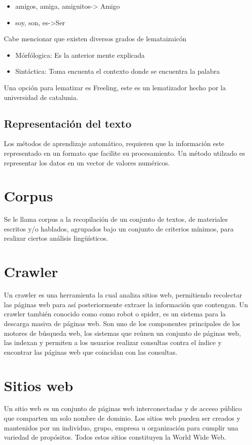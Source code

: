 	\begin{itemize}
		\item amigos, amiga, amiguitos-> Amigo
		\item soy, son, es->Ser
	\end{itemize}

Cabe mencionar que existen diversos grados de lemataizaicón

	\begin{itemize}
		\item Mórfólogica: Es la anterior mente explicada
		\item Sintáctica: Toma encuenta el contexto donde se encuentra la palabra

	\end{itemize}

Una opción para lematizar es Freeling, este es un lematizador hecho por la
universidad de catalunia.

\subsection[Representación del t.]{Representación del texto}
Los métodos de aprendizaje automático, requieren que la información este
representado en un formato que facilite su procesamiento. Un método utilzado
es representar los datos en un vector de valores numéricos.

\section{Corpus}
Se le llama corpus a la recopilación de un conjunto de textos, de materiales escritos y/o hablados, 
agrupados bajo un conjunto de criterios mínimos, para realizar ciertos análisis lingüísticos.


\section{Crawler}
Un crawler \cite{once} es una herramienta la cual analiza sitios web, permitiendo recolectar 
las páginas web para así posteriormente extraer la información que contengan. Un crawler también 
conocido como como robot o spider, es un sistema para la descarga masiva de páginas web. Son uno de 
los componentes principales de los motores de búsqueda web, los sistemas que reúnen un conjunto de 
páginas web, las indexan y permiten a los usuarios realizar consultas contra el índice y encontrar las 
páginas web que coincidan con las consultas.


\section{Sitios web}
Un sitio web \cite{doce} es un conjunto de páginas web interconectadas y de acceso público que comparten 
un solo nombre de dominio. Los sitios web pueden ser creados y mantenidos por un individuo, grupo, empresa 
u organización para cumplir una variedad de propósitos. Todos estos sitios constituyen la World Wide Web. 

